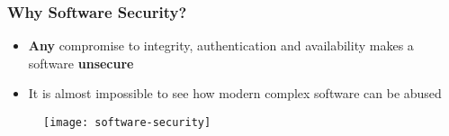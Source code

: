 \begin{frame}
\frametitle{Why Software Security?}
\begin{itemize}
	\item \textbf{Any} compromise to integrity, authentication and availability makes a software \textbf{unsecure}
	\item{It is almost impossible to see how modern complex software can be abused}
\end{itemize}
\begin{figure}
	\centering\texttt{[image: software-security]}
\end{figure}
\end{frame}